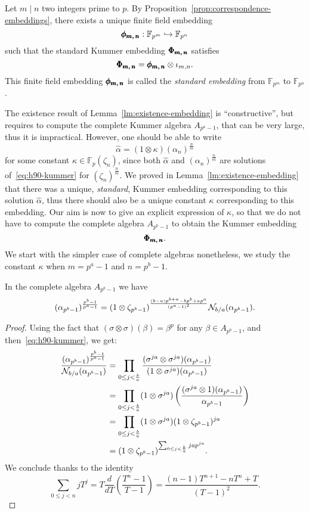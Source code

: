 \begin{defi}
  Let $m\mid n$ two integers prime to $p$. By
  Proposition~\ref{prop:correspondence-embeddings}, there exists a unique finite
  field embedding 
  \[
    \pmb{\phi_{{m},\,{n}}}:\mathbb{F}_{p^{m}}\hookrightarrow\mathbb{F}_{p^{n}}
  \]
  such that the standard Kummer embedding $\pmb{\Phi_{{m},\,{n}}}$ satisfies
  \[
    \pmb{\Phi_{{m},\,{n}}}=\pmb{\phi_{{m},\,{n}}}\otimes\iota_{m,n}.
  \]
  This finite field embedding $\pmb{\phi_{{m},\,{n}}}$ is called the \emph{standard embedding}
  from $\mathbb{F}_{p^{m}}$ to $\mathbb{F}_{p^{n}}$.
\end{defi}
The existence result of Lemma~\ref{lm:existence-embedding} is 
``constructive'', but requires to compute the complete Kummer algebra
$A_{p^a-1}$, that can be very large, thus it is impractical. However, one should
be able to write 
\[
  \hat\alpha = (1\otimes\kappa)(\alpha_n)^{\frac{n}{m}}
\]
for some constant $\kappa\in\mathbb{F}_p(\zeta_n)$,
since both $\hat\alpha$ and $(\alpha_n)^{\frac{n}{m}}$ are solutions
of~\eqref{eq:h90-kummer} for $(\zeta_n)^\frac{n}{m}$. We proved in
Lemma~\ref{lm:existence-embedding} that there was a unique, \emph{standard},
Kummer embedding corresponding to this solution $\hat\alpha$, thus there should
also be a unique constant $\kappa$ corresponding to this embedding. Our aim is
now to give an explicit expression of $\kappa$, so that we do not have to
compute the complete algebra $A_{p^b-1}$ to obtain the Kummer embedding
\[
  \pmb{\Phi_{{m},\,{n}}}.
\]
We start with the simpler case of complete algebras nonetheless, \ie we study
the constant $\kappa$ when $m=p^a-1$ and $n=p^b-1$.
\begin{prop}
  \label{prop:link-norm-power}
In the complete algebra $A_{p^b-1}$ we have
\[
(\alpha_{p^b-1})^{\frac{p^b-1}{p^a-1}}=(1\otimes\zeta_{p^b-1})^{\frac{(b-a)
  p^{b+a}-bp^b+ap^a}{(p^a-1)^2}}\mathcal{N}_{b/a}(\alpha_{p^b-1}).
\]
\end{prop}
\begin{proof}
  Using the fact that $(\sigma\otimes\sigma)(\beta) = \beta^p$ for any $\beta\in
  A_{p^b-1}$, and then~\eqref{eq:h90-kummer}, we get:
  \begin{align*}
\frac{(\alpha_{p^b-1})^{\frac{p^b-1}{p^a-1}}}{\mathcal{N}_{b/a}(\alpha_{p^b-1})}
&=\prod_{0\leq j<\frac{b}{a}}\frac{(\sigma^{ja}\otimes\sigma^{ja})(\alpha_{
p^b-1})}{(1\otimes\sigma^{ja})(\alpha_{p^b-1})}\\
&=\prod_{0\leq j<\frac{b}{a}}(1\otimes\sigma^{ja})\left(\frac{(\sigma^{ja}
\otimes 1)(\alpha_{p^b-1})}{\alpha_{p^b-1}}\right)\\
&=\prod_{0\leq j<\frac{b}{a}}(1\otimes\sigma^{ja})(1\otimes\zeta_{p^b-1})
^{ja}\\
&=(1\otimes\zeta_{p^b-1})^{\sum_{0\leq j<\frac{b}{a}}jap^{ja}}.
  \end{align*}
We conclude thanks to the identity
\[
\sum_{0\leq j<n}jT^j=T\frac{d}{dT}\!\left(\frac{T^n-1}{T-1}\right)=
\frac{(n-1)T^{n+1}-nT^n+T}{(T-1)^2}.
\]
\end{proof}
